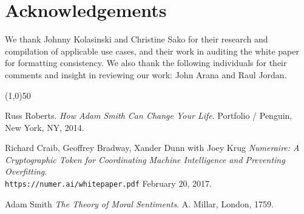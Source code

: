 \documentclass{article}
\begin{document}
\section {Acknowledgements}

We thank Johnny Kolasinski and Christine Sako for their research and compilation of applicable use cases, and their work in auditing the white paper for formatting consistency. We also thank the following individuals for their comments and insight in reviewing our work: John Arana and Raul Jordan.

\begin{center}
\line(1,0){50}
\end{center}





\begin{thebibliography}{9}
Russ Roberts.
\textit{How Adam Smith Can Change Your Life}.
Portfolio / Penguin, New York, NY, 2014.

Richard Craib, Geoffrey Bradway, Xander Dunn with Joey Krug
\textit{Numeraire: A Cryptographic Token for Coordinating Machine Intelligence and Preventing Overfitting}.
\\\texttt{https://numer.ai/whitepaper.pdf}
February 20, 2017.

Adam Smith
\textit{The Theory of Moral Sentiments}.
A. Millar, London, 1759.


\end{thebibliography}


\clearpage




\printglossaries

\end{document}

